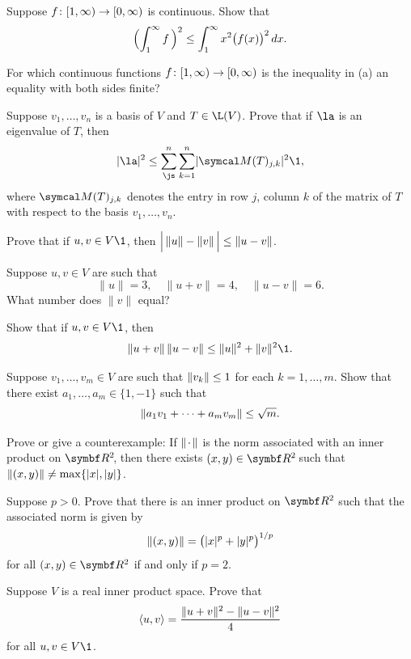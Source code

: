 \begin{exercises}
\exercise
\begin{SUBtheorem}
\item
Suppose $\fun f {[1, \infty)} {[0, \infty)}$ is continuous. Show that
\[
\paren[\Big]{ \int_1^\infty f\,}^2  \le \int_1^\infty x^2 \paren[\big]{ f(x) }^2 \, dx.
\]
\item
For which continuous functions $\fun f {[1, \infty)} {[0, \infty)}$ is the inequality in (a) an equality with both sides finite?
\end{SUBtheorem}


\exercise
Suppose $v_1, \ldots, v_n$ is a basis of $V$ and $T \in \L(V)$. Prove that if $\la$ is an eigenvalue of $T$, then \label{2HSeigen}
\[
\abs{\la}^2 \le \sum_{\js}^n \sum_{k=1}^n \abs{\M(T)_{j,k}}^2\1,
\]
where $\M(T)_{j,k}$ denotes the entry in row $j$, column $k$ of the matrix of $T$ with respect to the basis $v_1, \ldots, v_n$.


\exercise
Prove that if $u, v \in V\1$, then $\abs[\Big]{\, \norm{u} - \norm{v} \,} \le \norm{u-v}$.\label{6reverse}


\exercise
Suppose $u, v \in V$ are such that
\[
\|u\| = 3, \quad \|u + v\| = 4, \quad \|u - v\| = 6.
\]
What number does $\|v\|$ equal?


\exercise
Show that if $u, v \in V\1$, then
\[
\|u + v\| \, \|u - v\| \le \|u\|^2 + \|v\|^2\1.
\]
\exercisedisplayend


\exercise
Suppose $v_1, \dots, v_m \in V$ are such that $\norm{v_k} \le 1$ for each $k= 1, \ldots, m$. Show that there exist
$a_1, \dots, a_m \in \{1, -1\}$ such that
\[
\norm{a_1 v_1 + \dots + a_m v_m} \le \sqrt{m}.
\]
\exercisedisplayend


\exercise
Prove or give a counterexample: If $\norm{\Cdot}$ is the norm associated with an inner product on $\RR{2}$, then there exists $(x, y) \in \RR{2}$ such that
$
\norm{(x, y)} \ne \max\{|x|, |y|\}$.


\exercise
Suppose $p > 0$. Prove that there is an inner product on $\R{2}$ such that the associated norm is given by
\[
\|(x, y)\| = \paren[\big]{|x|^p + |y|^p}^{1/p}
\]
for all $(x, y) \in \R{2}$ if and only if $p = 2$.


\exercise
Suppose $V$ is a real inner product space. Prove that \label{201}
\[
\ip{u, v} = \frac{\|u + v\|^2 - \|u - v\|^2}{4}
\]
for all $u, v \in V\1$.



\end{exercises}
